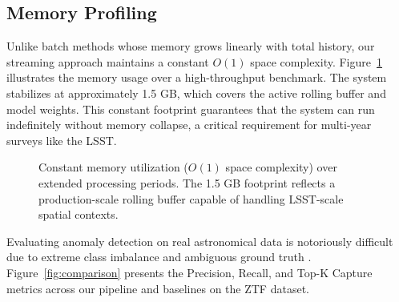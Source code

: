 \documentclass[10pt,journal,compsoc]{IEEEtran}
\begin{document}
\subsection{Memory Profiling}
Unlike batch methods whose memory grows linearly with total history, our streaming approach maintains a constant $O(1)$ space complexity. Figure~\ref{fig:memory} illustrates the memory usage over a high-throughput benchmark. The system stabilizes at approximately 1.5 GB, which covers the active rolling buffer and model weights. This constant footprint guarantees that the system can run indefinitely without memory collapse, a critical requirement for multi-year surveys like the LSST.

\begin{figure}[htbp]
    \centering
    \caption{Constant memory utilization ($O(1)$ space complexity) over extended processing periods. The 1.5 GB footprint reflects a production-scale rolling buffer capable of handling LSST-scale spatial contexts.}
    \label{fig:memory}
\end{figure}

Evaluating anomaly detection on real astronomical data is notoriously difficult due to extreme class imbalance and ambiguous ground truth \cite{zhao2020anomaly}. Figure~\ref{fig:comparison} presents the Precision, Recall, and Top-K Capture metrics across our pipeline and baselines on the ZTF dataset.
\end{document}
